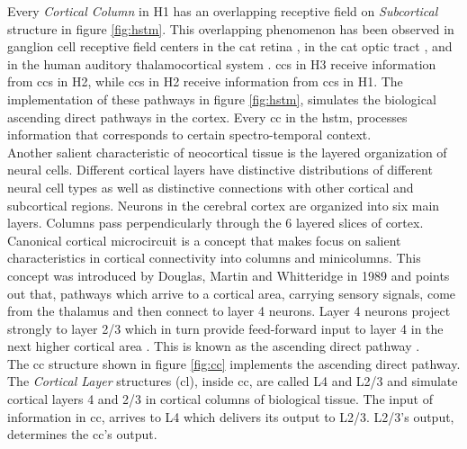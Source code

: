\documentclass[11pt,a4paper]{article}
\begin{document}
Every \textit{Cortical Column} in H1 has an overlapping receptive field on
\textit{Subcortical} structure in figure \ref{fig:hstm}.
This overlapping phenomenon has been observed in ganglion cell receptive field centers
in the cat retina \cite{peichl79}, in the cat optic tract \cite{fischer73},
and in the human auditory thalamocortical system \cite{miller01}.
\ac{cc}s in H3 receive information from \ac{cc}s in H2, while
\ac{cc}s in H2 receive information from \ac{cc}s in H1.
The implementation of these pathways in figure \ref{fig:hstm}, simulates the
biological ascending direct pathways in the cortex.
Every \ac{cc} in the \ac{hstm}, processes information that
corresponds to certain spectro-temporal context.\\

Another salient characteristic of neocortical tissue is
the layered organization of neural cells.
Different cortical layers have distinctive distributions
of different neural cell types as well as distinctive
connections with other cortical and
subcortical regions.
Neurons in the cerebral cortex are organized into six main layers.
Columns pass perpendicularly through the 6 layered slices of cortex.
Canonical cortical microcircuit is a concept that makes focus on salient characteristics
in cortical connectivity into columns and minicolumns.
This concept was introduced by Douglas, Martin and Whitteridge in 1989 \cite{douglas89}
and points out that, pathways which arrive to a cortical area,
carrying sensory signals, come from the thalamus and then connect to layer 4 neurons.
Layer 4 neurons project strongly to layer 2/3 which in turn
provide feed-forward input to layer 4 in the next higher
cortical area \cite{miller03}.
This is known as the ascending direct pathway \cite{shipp09}.\\

The \ac{cc} structure shown in figure \ref{fig:cc}
implements the ascending direct pathway.
The \textit{Cortical Layer} structures (\ac{cl}), inside \ac{cc},
are called L4 and L2/3 and simulate cortical
layers 4 and 2/3 in cortical columns of biological tissue.
The input of information in \ac{cc}, arrives to L4 which delivers its output
to L2/3.
L2/3's output, determines the \ac{cc}'s output.\\
\end{document}
